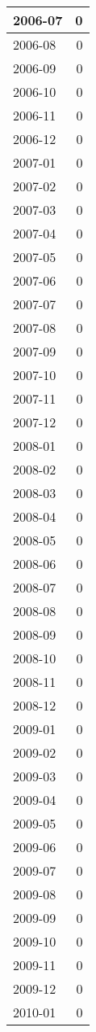 \documentclass[
]{article}
\begin{document}
\begin{table}[H]
\begin{tabular}{l|r}
\hline
2006-07 & 0\\
\hline
2006-08 & 0\\
\hline
2006-09 & 0\\
\hline
2006-10 & 0\\
\hline
2006-11 & 0\\
\hline
2006-12 & 0\\
\hline
2007-01 & 0\\
\hline
2007-02 & 0\\
\hline
2007-03 & 0\\
\hline
2007-04 & 0\\
\hline
2007-05 & 0\\
\hline
2007-06 & 0\\
\hline
2007-07 & 0\\
\hline
2007-08 & 0\\
\hline
2007-09 & 0\\
\hline
2007-10 & 0\\
\hline
2007-11 & 0\\
\hline
2007-12 & 0\\
\hline
2008-01 & 0\\
\hline
2008-02 & 0\\
\hline
2008-03 & 0\\
\hline
2008-04 & 0\\
\hline
2008-05 & 0\\
\hline
2008-06 & 0\\
\hline
2008-07 & 0\\
\hline
2008-08 & 0\\
\hline
2008-09 & 0\\
\hline
2008-10 & 0\\
\hline
2008-11 & 0\\
\hline
2008-12 & 0\\
\hline
2009-01 & 0\\
\hline
2009-02 & 0\\
\hline
2009-03 & 0\\
\hline
2009-04 & 0\\
\hline
2009-05 & 0\\
\hline
2009-06 & 0\\
\hline
2009-07 & 0\\
\hline
2009-08 & 0\\
\hline
2009-09 & 0\\
\hline
2009-10 & 0\\
\hline
2009-11 & 0\\
\hline
2009-12 & 0\\
\hline
2010-01 & 0\\

\end{tabular}
\end{table}
\end{document}

